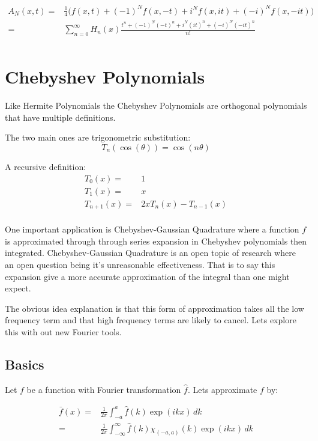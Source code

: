 \documentclass[12pt]{report}
\begin{document}
\begin{equation*}
\begin{aligned}
A_N(x,t) =& \frac{1}{4}\big(f(x,t)+(-1)^Nf(x,-t)+i^Nf(x,it)+(-i)^Nf(x,-it)\big)\\
=& \sum_{n=0}^\infty H_n(x)\frac{t^n+(-1)^N(-t)^n+i^N(it)^n+(-i)^N(-it)^n}{n!} \\
\end{aligned}
\end{equation*}

\section{Chebyshev Polynomials}
Like Hermite Polynomials the Chebyshev Polynomials are orthogonal polynomials that have multiple definitions.

The two main ones are trigonometric substitution:
\[T_n(\cos(\theta)) = \cos(n\theta)\]

A recursive definition:
\begin{equation*}
\begin{aligned}
	T_0(x) =& 1 \\
	T_1(x) =& x \\
	T_{n+1}(x) =& 2xT_n(x) - T_{n-1}(x)\\
\end{aligned}
\end{equation*}

One important application is Chebyshev-Gaussian Quadrature where a function $f$ is approximated through through series expansion in Chebyshev polynomials then integrated.
Chebyshev-Gaussian Quadrature is an open topic of research where an open question being it's unreasonable effectiveness.
That is to say this expansion give a more accurate approximation of the integral than one might expect.

The obvious idea explanation is that this form of approximation takes all the low frequency term and that high frequency terms are likely to cancel.
Lets explore this with out new Fourier tools.

\subsection{Basics}
Let $f$ be a function with Fourier transformation $\hat{f}$.
Lets approximate $f$ by:

\begin{equation*}
\begin{aligned}
\bar{f}(x) =& \frac{1}{2\pi}  \int_{-a}^{a}\hat{f}(k)\exp(ikx)\,dk\\
=& \frac{1}{2\pi}  \int_{-\infty}^{\infty}\hat{f}(k)\chi_{(-a,a)}(k)\exp(ikx)\,dk\\
\end{aligned}
\end{equation*}
\end{document}
